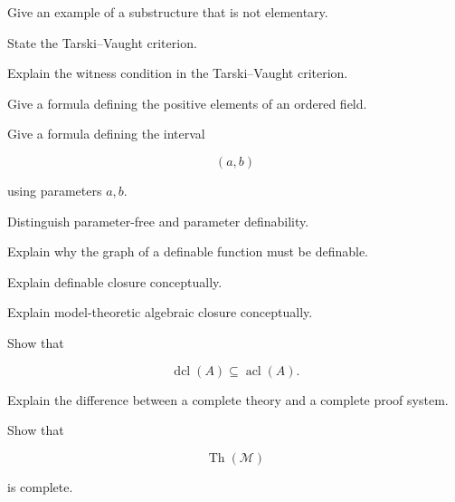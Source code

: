 \begin{exercise}[3]
Give an example of a substructure that is not elementary.
\end{exercise}

\begin{exercise}[3]
State the Tarski--Vaught criterion.
\end{exercise}

\begin{exercise}[3]
Explain the witness condition in the Tarski--Vaught criterion.
\end{exercise}

\begin{exercise}[2]
Give a formula defining the positive elements of an ordered field.
\end{exercise}

\begin{exercise}[2]
Give a formula defining the interval

\[
(a,b)
\]

using parameters \(a,b\).
\end{exercise}

\begin{exercise}[3]
Distinguish parameter-free and parameter definability.
\end{exercise}

\begin{exercise}[3]
Explain why the graph of a definable function must be definable.
\end{exercise}

\begin{exercise}[3]
Explain definable closure conceptually.
\end{exercise}

\begin{exercise}[3]
Explain model-theoretic algebraic closure conceptually.
\end{exercise}

\begin{exercise}[3]
Show that

\[
\operatorname{dcl}(A)
\subseteq
\operatorname{acl}(A).
\]
\end{exercise}

\begin{exercise}[2]
Explain the difference between a complete theory and a complete proof
system.
\end{exercise}

\begin{exercise}[3]
Show that

\[
\operatorname{Th}(\mathcal{M})
\]

is complete.
\end{exercise}


